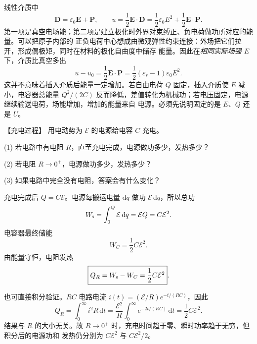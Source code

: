 {\begin{xesolution}
线性介质中
\[
 \boldsymbol D=\varepsilon_0\boldsymbol E+\boldsymbol P,
 \qquad
 u=\frac12\boldsymbol E\cdot\boldsymbol D
 =\frac12\varepsilon_0E^2+\frac12\boldsymbol E\cdot\boldsymbol P.
\]
第一项是真空电场能；第二项是建立极化时外界对束缚正、负电荷做功所对应的能量。可以把原子内部的
正负电荷中心想成由微观弹性约束连接：外场把它们拉开，形成偶极矩，同时在材料的极化自由度中储存
能量。因此在\emph{相同实际场强 $E$} 下，介质比真空多出
\[
 u-u_0=\frac12\boldsymbol E\cdot\boldsymbol P
 =\frac12(\varepsilon_r-1)\varepsilon_0E^2.
\]
这并不意味着插入介质后能量一定增加。若自由电荷 $Q$ 固定，插入介质使 $E$ 减小，电容器总能量
$Q^2/(2C)$ 反而降低，差值转化为机械功；若电压固定，电源继续输送电荷，场能增加，增加的能量来自
电源。必须先说明固定的是 $E$、$Q$ 还是 $U$。
\end{xesolution}



\begin{origexamplebox}{【充电过程】}\label{ch20:ex:s35-4-8}
用电动势为 $\mathcal E$ 的电源给电容 $C$ 充电。

(1) 若电路中有电阻 $R$，直至充电完成，电源做功多少，发热多少？

(2) 若电阻 $R\to0^+$，电源做功多少，发热多少？

(3) 如果电路中完全没有电阻，答案会有什么变化？

\ThQCharging
\end{origexamplebox}\par\nopagebreak[4]



\begin{xesolution}
\par\noindent\begin{minipage}{\linewidth}
\chargingEnergyFigure
{}
\end{minipage}\par\medskip
\ThACharging

充电完成后 $Q=C\mathcal E$。电源每搬运电量 $\mathrm dq$ 做功
$\mathcal E\,\mathrm dq$，所以总功
\[
 W_{\rm s}=\int_0^Q\mathcal E\,\mathrm dq
 =\mathcal EQ=C\mathcal E^2.
\]
电容器最终储能
\[
 W_C=\frac12C\mathcal E^2.
\]
由能量守恒，电阻发热
\[
 \boxed{Q_R=W_{\rm s}-W_C=\frac12C\mathcal E^2}.
\]

也可直接积分验证。$RC$ 电路电流
$i(t)=(\mathcal E/R)e^{-t/(RC)}$，因此
\[
 Q_R=\int_0^\infty i^2R\,\mathrm dt
 =\frac{\mathcal E^2}{R}\int_0^\infty e^{-2t/(RC)}\,\mathrm dt
 =\frac12C\mathcal E^2.
\]
结果与 $R$ 的大小无关。故 $R\to0^+$ 时，充电时间趋于零、瞬时功率趋于无穷，但积分后的电源功和
发热仍分别为 $C\mathcal E^2$ 与 $C\mathcal E^2/2$。


\end{xesolution}}
